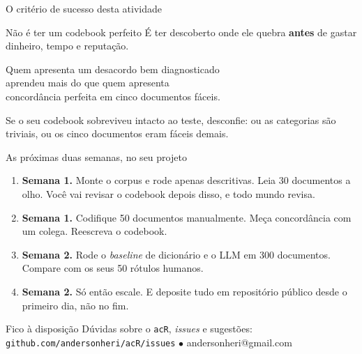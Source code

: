 \documentclass[11pt,aspectratio=169]{beamer}
\begin{document}
\begin{frame}{O critério de sucesso desta atividade}
\begin{alertblock}{Não é ter um codebook perfeito}
É ter descoberto onde ele quebra \textbf{antes} de gastar dinheiro, tempo e
reputação.
\end{alertblock}
\vspace{0.4cm}
\centering
\large
Quem apresenta um desacordo bem diagnosticado\\
aprendeu mais do que quem apresenta\\
concordância perfeita em cinco documentos fáceis.
\vspace{0.5cm}

\small Se o seu codebook sobreviveu intacto ao teste, desconfie: ou as
categorias são triviais, ou os cinco documentos eram fáceis demais.
\end{frame}

\begin{frame}{As próximas duas semanas, no seu projeto}
\begin{enumerate}\small
  \item \textbf{Semana 1.} Monte o corpus e rode apenas descritivas. Leia 30
        documentos a olho. Você vai revisar o codebook depois disso, e todo
        mundo revisa.
  \vspace{0.12cm}
  \item \textbf{Semana 1.} Codifique 50 documentos manualmente. Meça
        concordância com um colega. Reescreva o codebook.
  \vspace{0.12cm}
  \item \textbf{Semana 2.} Rode o \emph{baseline} de dicionário e o LLM em 300
        documentos. Compare com os seus 50 rótulos humanos.
  \vspace{0.12cm}
  \item \textbf{Semana 2.} Só então escale. E deposite tudo em repositório
        público desde o primeiro dia, não no fim.
\end{enumerate}
\vspace{0.2cm}
\begin{block}{Fico à disposição}
\footnotesize
Dúvidas sobre o \texttt{acR}, \emph{issues} e sugestões:
\texttt{github.com/andersonheri/acR/issues} $\bullet$ andersonheri@gmail.com
\end{block}
\end{frame}
\end{document}
